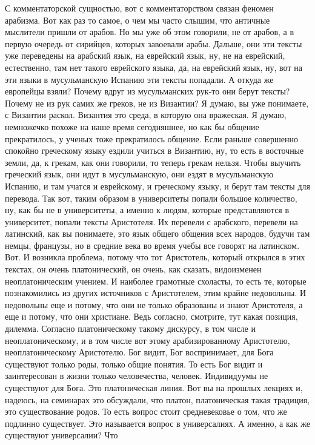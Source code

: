 С
комментаторской сущностью, вот с комментаторством связан феномен арабизма. Вот
как раз то самое, о чем мы часто слышим, что античные мыслители пришли от
арабов. Но мы уже об этом говорили, не от арабов, а в первую очередь от
сирийцев, которых завоевали арабы. Дальше, они эти тексты уже переведены на
арабский язык, на еврейский язык, ну, не на еврейский, естественно, там нет
такого еврейского языка, да, на еврейский язык, ну, вот на эти языки в
мусульманскую Испанию эти тексты попадали. А откуда же европейцы взяли? Почему
вдруг из мусульманских рук-то они берут тексты? Почему не из рук самих же
греков, не из Византии? Я думаю, вы уже понимаете, с Византии раскол. Византия
это среда, в которую она вражеская. Я думаю, немножечко похоже на наше время
сегодняшнее, но как бы общение прекратилось, у ученых тоже прекратилось общение.
Если раньше совершенно спокойно греческому языку ездили учиться в Византию, ну,
то есть в восточные земли, да, к грекам, как они говорили, то теперь грекам
нельзя. Чтобы выучить греческий язык, они идут в мусульманскую, они ездят в
мусульманскую Испанию, и там учатся и еврейскому, и греческому языку, и берут
там тексты для перевода. Так вот, таким образом в университеты попали большое
количество, ну, как бы не в университеты, а именно к людям, которые
представляются в университет, попали тексты Аристотеля. Их перевели с арабского,
перевели на латинский, как вы понимаете, это язык общего общения всех народов,
будучи там немцы, французы, но в средние века во время учебы все говорят на
латинском. Вот. И возникла проблема, потому что тот Аристотель, который открылся
в этих текстах, он очень платонический, он очень, как сказать, видоизменен
неоплатоническим учением. И наиболее грамотные схоласты, то есть те, которые
познакомились из других источников с Аристотелем, этим крайне недовольны. И
недовольны еще и потому, что они не только образованы и знают Аристотеля, а еще
и потому, что они христиане. Ведь согласно, смотрите, тут какая позиция,
дилемма. Согласно платоническому такому дискурсу, в том числе и
неоплатоническому, и в том числе вот этому арабизированному Аристотелю,
неоплатоническому Аристотелю. Бог видит, Бог воспринимает, для Бога существуют
только роды, только общие понятия. То есть Бог видит и заинтересован в жизни
только человечества, человек. Индивидуумы не существуют для Бога. Это
платоническая линия. Вот вы на прошлых лекциях и, надеюсь, на семинарах это
обсуждали, что платон, платоническая такая традиция, это существование родов. То
есть вопрос стоит средневековье о том, что же подлинно существует. Это
называется вопрос в универсалиях. А именно, а как же существуют универсалии? Что
